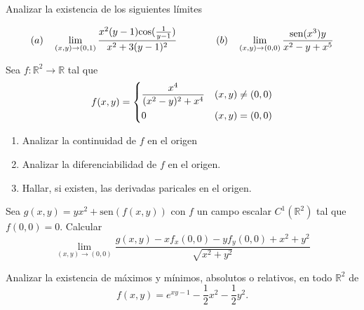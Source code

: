 
\begin{question}
    Analizar la existencia de los siguientes límites
    
    \[
    (a) \quad \lim_{(x,y)\to(0,1)} \frac{x^2(y-1)\text{cos}(\frac{1}{y-1})}{x^2+3(y-1)^2}
    \hfill
    \qquad\qquad(b) \quad \lim_{(x,y)\to(0,0)} \frac{\text{sen}(x^3)y}{x^2-y+x^5}
    \]
    
\end{question}


\begin{question}
    Sea \(f: \mathbb{R}^2 \to \mathbb{R}\) tal que
    \[
    f(x,y) = 
    \begin{dcases}
        \frac{x^4}{(x^2-y)^2+x^4} & (x,y) \neq (0,0) \\
        0 & (x,y) = (0,0)     
    \end{dcases}
    \]
    \begin{enumerate}
        \item Analizar la continuidad de $f$ en el origen
        \item Analizar la diferenciabilidad de $f$ en el origen.
        \item Hallar, si existen, las derivadas paricales en el origen.
    \end{enumerate}
\end{question}


\begin{question}
    Sea \(g(x,y) = yx^2+\text{sen}(f(x,y))\) con $f$ un campo escalar \(C^1(\mathbb{R}^2)\) tal que \(f(0,0)=0\). Calcular
    \[
    \lim_{(x,y)\to(0,0)} \frac{g(x,y)-xf_x(0,0)-yf_y(0,0)+x^2+y^2}{\sqrt{x^2+y^2}}
    \]
\end{question}


\begin{question}
    Analizar la existencia de máximos y mínimos, absolutos o relativos, en todo $\mathbb{R}^2$ de
    \[
    f(x,y) = e^{xy-1}-\frac{1}{2}x^2-\frac{1}{2}y^2.
    \]
\end{question}

\newpage

